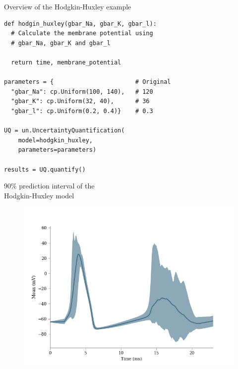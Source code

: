 \documentclass[presentation]{beamer}
\begin{document}
\begin{frame}[fragile]{Overview of the Hodgkin-Huxley example}
\vspace{-3mm}

\begin{lstlisting}
def hodgin_huxley(gbar_Na, gbar_K, gbar_l):
  # Calculate the membrane potential using
  # gbar_Na, gbar_K and gbar_l

  return time, membrane_potential

parameters = {                       # Original
  "gbar_Na": cp.Uniform(100, 140),   # 120
  "gbar_K": cp.Uniform(32, 40),      # 36
  "gbar_l": cp.Uniform(0.2, 0.4)}    # 0.3

UQ = un.UncertaintyQuantification(
    model=hodgkin_huxley,
    parameters=parameters)

results = UQ.quantify()
\end{lstlisting}

\end{frame}



\begin{frame}{90\% prediction interval of the \\ Hodgkin-Huxley model}
  \vspace{-5mm}
  \begin{figure}
    \includegraphics[width=1\textwidth]{hh_prediction.png}
  \end{figure}

\end{frame}
\end{document}
